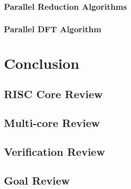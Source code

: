 \documentclass[11pt,a4paper]{report}
\begin{document}
{        \subsection{Parallel Reduction Algorithms}
        \subsection{Parallel DFT Algorithm}


\chapter{Conclusion}
{\hypersetup{linkcolor=black}
\startcontents[chapters]
}
    \section{RISC Core Review}
    \section{Multi-core Review}
    \section{Verification Review}
    \section{Goal Review}

}
\end{document}

